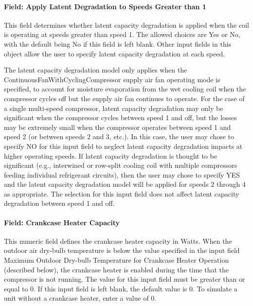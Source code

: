 \paragraph{Field: Apply Latent Degradation to Speeds Greater than 1}\label{field-apply-latent-degradation-to-speeds-greater-than-1}

This field determines whether latent capacity degradation is applied when the coil is operating at speeds greater than speed 1. The allowed choices are Yes or No, with the default being No if this field is left blank. Other input fields in this object allow the user to specify latent capacity degradation at each speed.

The latent capacity degradation model only applies when the ContinuousFanWithCyclingCompressor supply air fan operating mode is specified, to account for moisture evaporation from the wet cooling coil when the compressor cycles off but the supply air fan continues to operate. For the case of a single multi-speed compressor, latent capacity degradation may only be significant when the compressor cycles between speed 1 and off, but the losses may be extremely small when the compressor operates between speed 1 and speed 2 (or between speeds 2 and 3, etc.). In this case, the user may chose to specify NO for this input field to neglect latent capacity degradation impacts at higher operating speeds. If latent capacity degradation is thought to be significant (e.g., interwined or row-split cooling coil with multiple compressors feeding individual refrigerant circuits), then the user may chose to specify YES and the latent capacity degradation model will be applied for speeds 2 through 4 as appropriate. The selection for this input field does not affect latent capacity degradation between speed 1 and off.

\paragraph{Field: Crankcase Heater Capacity}\label{field-crankcase-heater-capacity-2}

This numeric field defines the crankcase heater capacity in Watts. When the outdoor air dry-bulb temperature is below the value specified in the input field Maximum Outdoor Dry-bulb Temperature for Crankcase Heater Operation (described below), the crankcase heater is enabled during the time that the compressor is not running. The value for this input field must be greater than or equal to 0. If this input field is left blank, the default value is 0. To simulate a unit without a crankcase heater, enter a value of 0.

